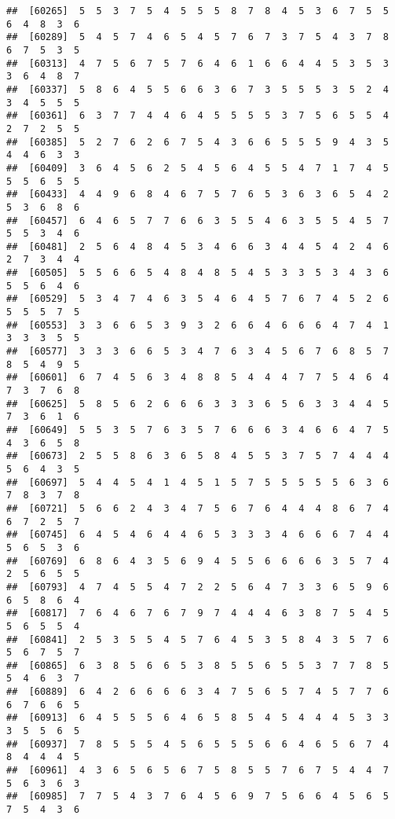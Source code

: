 \documentclass[
]{book}
\begin{document}
\begin{verbatim}
##  [60265]  5  5  3  7  5  4  5  5  5  8  7  8  4  5  3  6  7  5  5  6  4  8  3  6
##  [60289]  5  4  5  7  4  6  5  4  5  7  6  7  3  7  5  4  3  7  8  6  7  5  3  5
##  [60313]  4  7  5  6  7  5  7  6  4  6  1  6  6  4  4  5  3  5  3  3  6  4  8  7
##  [60337]  5  8  6  4  5  5  6  6  3  6  7  3  5  5  5  3  5  2  4  3  4  5  5  5
##  [60361]  6  3  7  7  4  4  6  4  5  5  5  5  3  7  5  6  5  5  4  2  7  2  5  5
##  [60385]  5  2  7  6  2  6  7  5  4  3  6  6  5  5  5  9  4  3  5  4  4  6  3  3
##  [60409]  3  6  4  5  6  2  5  4  5  6  4  5  5  4  7  1  7  4  5  5  5  6  5  5
##  [60433]  4  4  9  6  8  4  6  7  5  7  6  5  3  6  3  6  5  4  2  5  3  6  8  6
##  [60457]  6  4  6  5  7  7  6  6  3  5  5  4  6  3  5  5  4  5  7  5  5  3  4  6
##  [60481]  2  5  6  4  8  4  5  3  4  6  6  3  4  4  5  4  2  4  6  2  7  3  4  4
##  [60505]  5  5  6  6  5  4  8  4  8  5  4  5  3  3  5  3  4  3  6  5  5  6  4  6
##  [60529]  5  3  4  7  4  6  3  5  4  6  4  5  7  6  7  4  5  2  6  5  5  5  7  5
##  [60553]  3  3  6  6  5  3  9  3  2  6  6  4  6  6  6  4  7  4  1  3  3  3  5  5
##  [60577]  3  3  3  6  6  5  3  4  7  6  3  4  5  6  7  6  8  5  7  8  5  4  9  5
##  [60601]  6  7  4  5  6  3  4  8  8  5  4  4  4  7  7  5  4  6  4  7  3  7  6  8
##  [60625]  5  8  5  6  2  6  6  6  3  3  3  6  5  6  3  3  4  4  5  7  3  6  1  6
##  [60649]  5  5  3  5  7  6  3  5  7  6  6  6  3  4  6  6  4  7  5  4  3  6  5  8
##  [60673]  2  5  5  8  6  3  6  5  8  4  5  5  3  7  5  7  4  4  4  5  6  4  3  5
##  [60697]  5  4  4  5  4  1  4  5  1  5  7  5  5  5  5  5  6  3  6  7  8  3  7  8
##  [60721]  5  6  6  2  4  3  4  7  5  6  7  6  4  4  4  8  6  7  4  6  7  2  5  7
##  [60745]  6  4  5  4  6  4  4  6  5  3  3  3  4  6  6  6  7  4  4  5  6  5  3  6
##  [60769]  6  8  6  4  3  5  6  9  4  5  5  6  6  6  6  3  5  7  4  2  5  6  5  5
##  [60793]  4  7  4  5  5  4  7  2  2  5  6  4  7  3  3  6  5  9  6  6  5  8  6  4
##  [60817]  7  6  4  6  7  6  7  9  7  4  4  4  6  3  8  7  5  4  5  5  6  5  5  4
##  [60841]  2  5  3  5  5  4  5  7  6  4  5  3  5  8  4  3  5  7  6  5  6  7  5  7
##  [60865]  6  3  8  5  6  6  5  3  8  5  5  6  5  5  3  7  7  8  5  5  4  6  3  7
##  [60889]  6  4  2  6  6  6  6  3  4  7  5  6  5  7  4  5  7  7  6  6  7  6  6  5
##  [60913]  6  4  5  5  5  6  4  6  5  8  5  4  5  4  4  4  5  3  3  3  5  5  6  5
##  [60937]  7  8  5  5  5  4  5  6  5  5  5  6  6  4  6  5  6  7  4  8  4  4  4  5
##  [60961]  4  3  6  5  6  5  6  7  5  8  5  5  7  6  7  5  4  4  7  5  6  3  6  3
##  [60985]  7  7  5  4  3  7  6  4  5  6  9  7  5  6  6  4  5  6  5  7  5  4  3  6

\end{verbatim}
\end{document}
